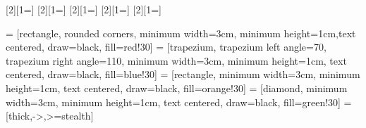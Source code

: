 

[2][1=]{}
[2][1=]{}
[2][1=]{}
[2][1=]{}
[2][1=]{}

 = [rectangle, rounded corners, minimum width=3cm, minimum height=1cm,text centered, draw=black, fill=red!30]
 = [trapezium, trapezium left angle=70, trapezium right angle=110, minimum width=3cm, minimum height=1cm, text centered, draw=black, fill=blue!30]
 = [rectangle, minimum width=3cm, minimum height=1cm, text centered, draw=black, fill=orange!30]
 = [diamond, minimum width=3cm, minimum height=1cm, text centered, draw=black, fill=green!30]
 = [thick,->,>=stealth]
\pgfplotsset{compat=1.18}




